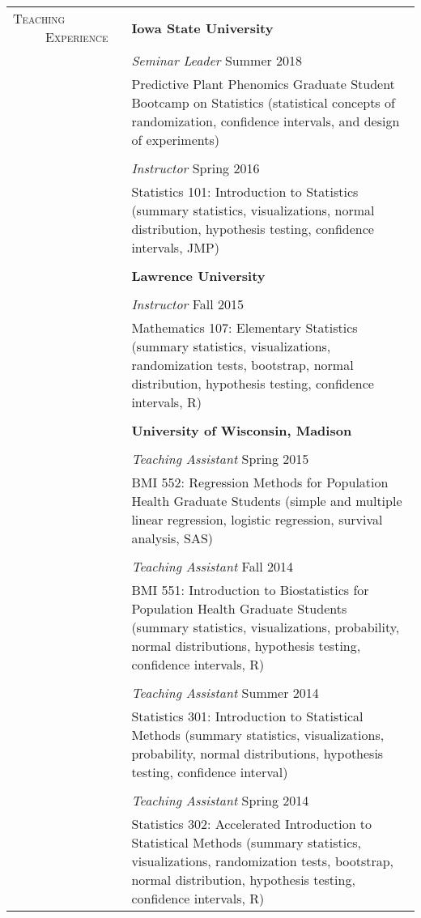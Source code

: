 \documentclass[11pt, oneside]{article}
\begin{document}
\noindent 
\begin{longtable}{p{3cm}p{14cm}}
\textsc{Teaching \ \ \ \ \ Experience} & \textbf{Iowa State University}\\
& \emph{Seminar Leader} \hfill{Summer 2018}\\
& Predictive Plant Phenomics Graduate Student Bootcamp on Statistics (statistical concepts of randomization, confidence intervals, and design of experiments)\\
\\
& \emph{Instructor} \hfill{Spring 2016}\\
& Statistics 101: Introduction to Statistics (summary statistics, visualizations, normal distribution, hypothesis testing, confidence intervals, JMP)\\
\\
& \textbf{Lawrence University}\\
\\
& \emph{Instructor} \hfill{Fall 2015}\\
& Mathematics 107: Elementary Statistics (summary statistics, visualizations, randomization tests, bootstrap, normal distribution, hypothesis testing, confidence intervals, R)\\
\\
& \textbf{University of Wisconsin, Madison}\\
\\
& \emph{Teaching Assistant} \hfill{Spring 2015}\\
& BMI 552: Regression Methods for Population Health Graduate Students (simple and multiple linear regression, logistic regression, survival analysis, SAS)\\
\\
& \emph{Teaching Assistant} \hfill{Fall 2014}\\
& BMI 551: Introduction to Biostatistics for Population Health Graduate Students (summary statistics, visualizations, probability, normal distributions, hypothesis testing, confidence intervals, R)\\
\\
& \emph{Teaching Assistant} \hfill{Summer 2014}\\
& Statistics 301: Introduction to Statistical Methods (summary statistics, visualizations, probability, normal distributions, hypothesis testing, confidence interval)\\
\\
& \emph{Teaching Assistant} \hfill{Spring 2014}\\ 
& Statistics 302: Accelerated Introduction to Statistical Methods (summary statistics, visualizations, randomization tests, bootstrap, normal distribution, hypothesis testing, confidence intervals, R)\\

\end{longtable}
\end{document}
